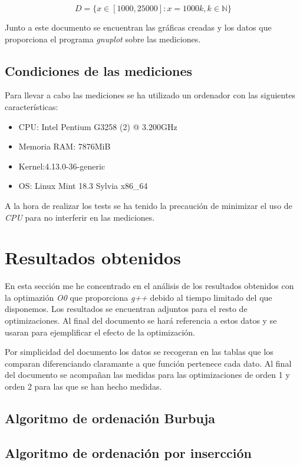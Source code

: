 \documentclass{article}
\begin{document}
$$D = \{x \in [1000, 25000]: x = 1000k, k \in \mathbb{N}\}$$

Junto a este documento se encuentran las gráficas creadas y los datos
que proporciona el programa \textit{gnuplot} sobre las mediciones.

\subsection{Condiciones de las mediciones}

Para llevar a cabo las mediciones se ha utilizado un ordenador con las siguientes características:

\begin{itemize}
\item CPU: Intel Pentium G3258 (2) @ 3.200GHz
\item Memoria RAM: 7876MiB
\item Kernel:4.13.0-36-generic
\item OS: Linux Mint 18.3 Sylvia x86\_64
\end{itemize}

A la hora de realizar los tests se ha tenido la precaución de
minimizar el uso de \textit{CPU} para no interferir en las mediciones.

\section{Resultados obtenidos}

En esta sección me he concentrado en el análisis de los resultados
obtenidos con la optimazión \textit{O0} que proporciona \textit{g++}
debido al tiempo limitado del que disponemos. Los resultados se
encuentran adjuntos para el resto de optimizaciones. Al final del
documento se hará referencia a estos datos y se usaran para
ejemplificar el efecto de la optimización.

Por simplicidad del documento los datos se recogeran en las tablas que
los comparan diferenciando claramante a que función pertenece cada
dato. Al final del documento se acompañan las medidas para las
optimizaciones de orden 1 y orden 2 para las que se han hecho medidas.

\subsection{Algoritmo de ordenación Burbuja}


\subsection{Algoritmo de ordenación por insercción}
\end{document}
